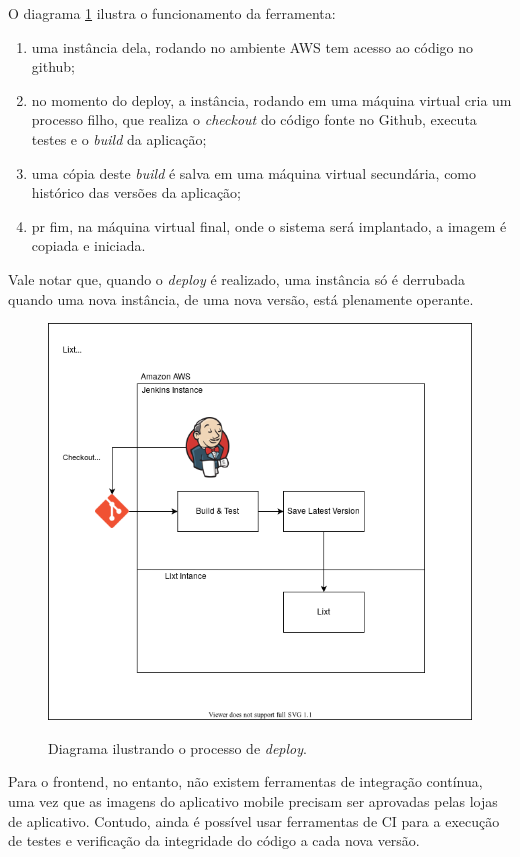 O diagrama \ref{fig:jenkins} ilustra o funcionamento da ferramenta:
\begin{enumerate}
\item uma instância dela, rodando no ambiente AWS tem acesso ao código no
github;
\item no momento do \gls{deploy}, a instância, rodando em uma máquina
  virtual cria um processo filho, que realiza o \emph{checkout} do
  código fonte no Github, executa testes e o \emph{build} da
  aplicação;
\item uma cópia deste \emph{build} é salva em uma máquina virtual
  secundária, como histórico das versões da aplicação;
\item pr fim, na máquina virtual final, onde o sistema será
  implantado, a imagem é copiada e iniciada.
\end{enumerate}
Vale notar que, quando o \emph{deploy} é realizado, uma instância só é
derrubada quando uma nova instância, de uma nova versão, está
plenamente operante.

\begin{figure}
  \centering
  \caption{Diagrama ilustrando o processo de \emph{deploy}.}
  \includegraphics[scale=0.50]{images/deploy}
  \label{fig:jenkins}
\end{figure}

Para o \gls{frontend}, no entanto, não existem ferramentas de
integração contínua, uma vez que as imagens do aplicativo mobile
precisam ser aprovadas pelas lojas de aplicativo. Contudo, ainda é
possível usar ferramentas de CI para a execução de testes e
verificação da integridade do código a cada nova versão.

